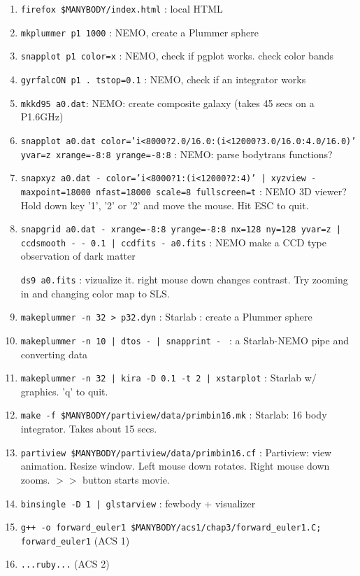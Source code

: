 \begin{enumerate}

\item
{\tt firefox \$MANYBODY/index.html} : local HTML 

\item
{\tt mkplummer p1 1000} : NEMO, create a Plummer sphere

\item
{\tt snapplot p1 color=x} : NEMO, check if pgplot works. check color bands 

\item
{\tt gyrfalcON p1 . tstop=0.1} : NEMO, check if an integrator works

\item
{\tt mkkd95 a0.dat}: NEMO: create composite galaxy (takes 45 secs on a P1.6GHz)

\item
{\tt snapplot a0.dat color='i<8000?2.0/16.0:(i<12000?3.0/16.0:4.0/16.0)' yvar=z xrange=-8:8 yrange=-8:8} :
NEMO: parse bodytrans functions?

\item
{\tt snapxyz a0.dat - color='i<8000?1:(i<12000?2:4)' | xyzview - maxpoint=18000 nfast=18000 scale=8 fullscreen=t} : 
NEMO 3D viewer? Hold down key '1', '2' or '2' and move the mouse. Hit ESC to quit.

\item 
{\tt snapgrid a0.dat - xrange=-8:8 yrange=-8:8 nx=128 ny=128 yvar=z | ccdsmooth - - 0.1 | ccdfits - a0.fits} :
NEMO make a CCD type observation of dark matter

{\tt ds9 a0.fits} : vizualize it. right mouse down changes contrast. Try zooming in and changing color map to SLS.

\item
{\tt makeplummer -n 32 > p32.dyn} : Starlab : create a Plummer sphere


\item
{\tt makeplummer -n 10 | dtos - | snapprint - } : a Starlab-NEMO pipe and converting data

\item
{\tt makeplummer -n 32 | kira -D 0.1 -t 2 | xstarplot} : Starlab w/ graphics. 'q' to quit.

\item
{\tt make -f \$MANYBODY/partiview/data/primbin16.mk} : Starlab: 16 body integrator. Takes about 15 secs.

\item
{\tt partiview  \$MANYBODY/partiview/data/primbin16.cf} : Partiview: view animation. Resize window.
Left mouse down rotates. Right mouse down zooms. $>>$ button starts movie.

\item
{\tt binsingle -D 1 | glstarview} : fewbody + visualizer

\item
{\tt g++ -o forward\_euler1 \$MANYBODY/acs1/chap3/forward\_euler1.C; forward\_euler1} 
(ACS 1)

\item
{\tt ...ruby...}
(ACS 2)


\end{enumerate}


